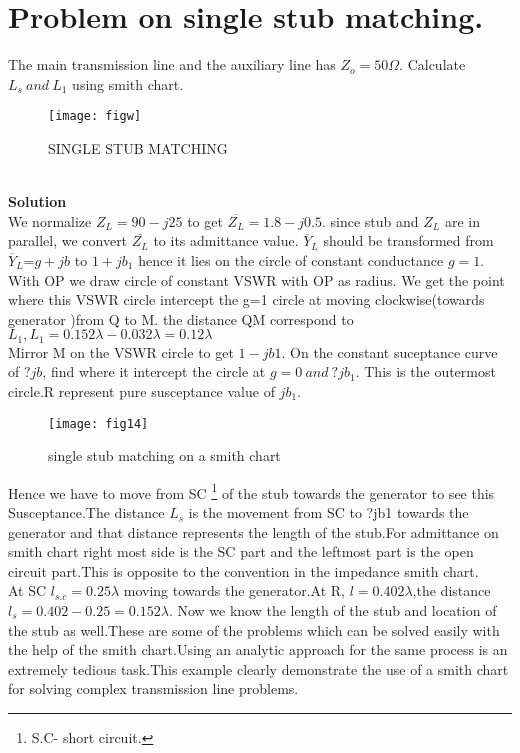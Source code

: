      \section{Problem on single stub matching.}
    The main transmission line and the auxiliary line has $Z_o=50\varOmega$. Calculate $L_s\ and\ L_1$ using smith chart.
    \begin{figure}[h]
    	\centering
   	\texttt{[image: figw]}
    	\caption{SINGLE STUB MATCHING}
    \end{figure}\\
\textbf{Solution}\\
We normalize $Z_L=90-j25$ to get 
$\overline{Z_{L}}=1.8-j0.5$. since stub and $Z_L$ are in parallel,
 we convert $\overline{Z_{L}}$ to its admittance value. $\overline{Y}_{L}$
  should be transformed from 
 $\overline{Y}_{L}$=$g+jb$ to $1+jb_1$ hence it lies  on  the circle of constant conductance $g=1$. With OP we draw circle of constant VSWR with OP as radius. We get the point where this VSWR circle intercept the g=1 circle at moving clockwise(towards generator )from Q to M. the distance QM correspond to $L_1, L_1=0.152\lambda-0.032\lambda=0.12\lambda$\\
 Mirror M on the VSWR circle to get $1-jb1$. On the constant suceptance curve of $?jb$, find where it intercept the circle at $g=0 \ and \ ?jb_1$. This is the outermost circle.R represent pure susceptance value of $jb_1$. 

\begin{figure}[h]
\centering
\texttt{[image: fig14]}
\caption{single stub matching on a smith chart}
\end{figure}
 Hence we have to move from SC \footnote{S.C- short circuit.} of the stub towards the generator to see this Susceptance.The distance $L_s$ is the movement from SC to ?jb1 towards the generator and that distance represents the length of the stub.For admittance on smith chart right most side is the SC part and the leftmost  part is the open circuit part.This is  opposite to the convention in the impedance smith chart.\\
At SC $l_{s.c}=0.25\lambda$ moving towards the generator.At R, $l=0.402\lambda$,the distance $l_s=0.402-0.25=0.152\lambda$. Now we know the length of the stub and location of the stub as well.These are some of the problems which can be solved easily with the help of the smith chart.Using an analytic approach for the same  process is an extremely tedious task.This example clearly demonstrate the use of a smith  chart for solving complex transmission line problems.
